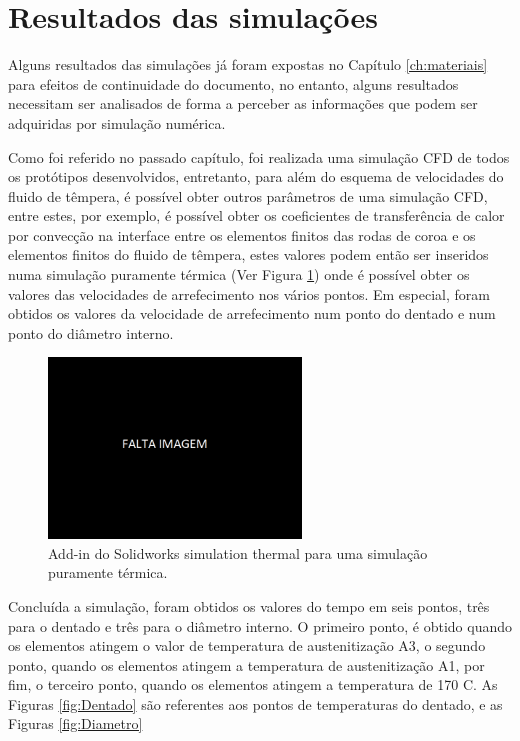 \section{Resultados das simulações} \label{sec:resultados_simulacoes}
Alguns resultados das simulações já foram expostas no Capítulo \ref{ch:materiais} para efeitos de continuidade do documento, no entanto, alguns resultados necessitam ser analisados de forma a perceber as informações que podem ser adquiridas por simulação numérica.
\par
Como foi referido no passado capítulo, foi realizada uma simulação CFD de todos os protótipos desenvolvidos, entretanto, para além do esquema de velocidades do fluido de têmpera, é possível obter outros parâmetros de uma simulação CFD, entre estes, por exemplo, é possível obter os coeficientes de transferência de calor por convecção na interface entre os elementos finitos das rodas de coroa e os elementos finitos do fluido de têmpera, estes valores podem então ser inseridos numa simulação puramente térmica (Ver Figura \ref{fig:simulacao_termica}) onde é possível obter os valores das velocidades de arrefecimento nos vários pontos. Em especial, foram obtidos os valores da velocidade de arrefecimento num ponto do dentado e num ponto do diâmetro interno.
\begin{figure}[htb]
    \centering
    \includegraphics[width = 0.6\textwidth]{Figures/Cap4/Falta_Imagem.png}
    \caption[Simulação puramente térmica Solidworks]%
    {Add-in do Solidworks simulation thermal para uma simulação puramente térmica.}
    \label{fig:simulacao_termica}
\end{figure}
\par
Concluída a simulação, foram obtidos os valores do tempo em seis pontos, três para o dentado e três para o diâmetro interno. O primeiro ponto, é obtido quando os elementos atingem o valor de temperatura de austenitização A3, o segundo ponto, quando os elementos atingem a temperatura de austenitização A1, por fim, o terceiro ponto, quando os elementos atingem a temperatura de 170 \textdegree C. As Figuras \ref{fig:Dentado} são referentes aos pontos de temperaturas do dentado, e as Figuras \ref{fig:Diametro}
